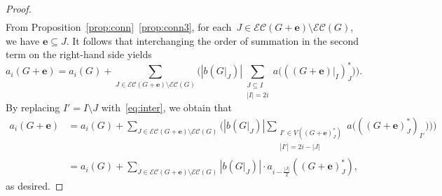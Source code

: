 \documentclass[10pt]{amsart}
\theoremstyle{plain}
\numberwithin{equation}{section}
\theoremstyle{definition}
\newcommand{\edge}{\mathbf{e}}
\newcommand{\EC}{\mathcal{E}\mathcal{C}}
\begin{document}
\begin{proof}
\begin{align*}
    \end{align*}
    From Proposition~\ref{prop:conn}~\eqref{prop:conn3}, for each~$J \in \EC(G+\edge) \setminus \EC(G)$, we have $\edge \subseteq J$.
    It follows that interchanging the order of summation in the second term on the right-hand side yields
    $$
       a_i(G+\edge) = a_i(G) + \sum_{J \in \EC(G+\edge) \setminus \EC(G)}\Big( \left\vert b(G\vert_J) \right\vert \sum_{\substack{J \subseteq I\\ |I| =2i}} a\big(((G+\edge)\vert_I)^\ast_J\big)\Big).
    $$
    By replacing $I' =I \setminus J$ with~\eqref{eq:inter}, we obtain that
    \begin{align*}
      a_i(G+\edge) & = a_i(G) + \sum_{J \in \EC(G+\edge) \setminus \EC(G)}\Big( \left\vert b(G\vert_J) \right\vert \sum_{\substack{I' \in V((G+\edge)^\ast_J)\\ |I'| =2i-\left\vert J \right\vert}} a\big(((G+\edge)^\ast_J)_{I'})\big)\Big) \\
       & = a_i(G) + \sum_{J \in \EC(G+\edge) \setminus \EC(G)} \left\vert b(G \vert_J) \right\vert \cdot a_{i-\frac{|J|}{2}}((G +\edge)^\ast_J),
    \end{align*}
as desired.
\end{proof}
\end{document}
